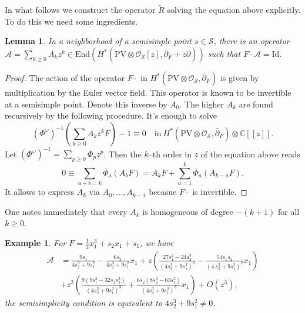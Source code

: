 \documentclass[12pt,a4paper]{amsart}
\newcommand{\CC}{{\mathbb{C}}}
\newcommand{\QQ}{{\mathbb{Q}}}
\newcommand{\wt}{\mathrm{wt}}
\def\A{{\mathcal A}}
\def\O{{\mathcal O}}
\renewcommand{\S}{{\mathcal S}}
\newcommand{\p}{{\partial}}
\newcommand{\<}{\left<}
\renewcommand{\>}{\right>}
\newcommand{\Id}{\mathrm{Id}}
\newcommand{\PV}{{\mathrm{PV}}}
\newcommand{\End}{{\mathrm{End}}}
\newtheorem{lemma}[theorem]{Lemma}
\newtheorem{example}[theorem]{Example}
\numberwithin{equation}{section}
\begin{document}
In what follows we construct the operator $\widetilde R$ solving the equation above explicitly. To do this we need some ingredients.


\begin{lemma}
In a neighborhood of a semisimple point $s \in \S$, there is an operator $\A = \sum_{k \ge 0} A_k z^k \in \End(H^\ast( \PV \otimes \O_\S[z], \bar \p_F + z \p))$ such that $F \cdot \A = \Id$.

\end{lemma}
\begin{proof}
    The action of the operator $F \cdot$ in $H^\ast( \PV \otimes \O_\S, \bar \p_F )$ is given by multiplication by the Euler vector field. This operator is known to be invertible at a semisimple point. Denote this inverse by $A_0$. The higher $A_k$ are found recursively by the following procedure. It's enough to solve
    \[
        (\Phi^{\omega})^{-1} \left( \sum_{k \ge 0} A_k z^k F \right) - 1 \equiv 0 \quad \text{in} \ H^\ast( \PV \otimes \O_\S, \bar \p_F ) \otimes \CC[[z]].
    \]
    Let $(\Phi^{\omega})^{-1} = \sum_{p \ge 0} \overline \Phi_p z^p$. Then the $k$--th order in $z$ of the equation above reads
    \[
        0 \equiv \sum_{a+b = k} \overline \Phi_a (A_b F) = A_k F + \sum_{a=1}^k \overline \Phi_a (A_{k-a} F).
    \]
    It allows to express $A_k$ via $A_0,\dots,A_{k-1}$ becasue $F \cdot$ is invertible.

\end{proof}

One notes immediately that every $A_k$ is homogeneous of degree $-(k+1)$ for all $k \ge 0$.

\begin{example}
 For $F = \frac{1}{3} x_1^3 + s_2 x_1 + s_1$, we have
 \begin{align*}
    \A &= \frac {9 s_1} {4 s_2^3 + 9 s_1^2} -\frac {6 s_2} {4 s_2^3 + 9 s_1^2} x_ 1 + z\left (\frac {27 s_1^2 - 24 s_2^3 } {\left (4 s_2^3 +
        9 s_1^2 \right)^2} - \frac {54 s_1 s_2 } {\left (4 \
s_2^3 + 9 s_1^2 \right)^2} x_ 1 \right)
    \\
    &+ z^2\left (
    \frac {9\left (9 s_1^3 - 32 s_1 s_2^3 \right)} {\left (4 s_2^3 + 9 s_1^2 \right)^3}
    + \frac {6 s_2\left (8 s_2^3 - 63 s_1^2 \right)} {\left (4 s_2^3 + 9 s_1^2 \right)^3}x_ 1
    \right) + O(z^3),
 \end{align*}
 the semisimplicity condition is equivalent to $4 s_2^3 + 9 s_1^2 \neq 0$.
\end{example}
\end{document}
